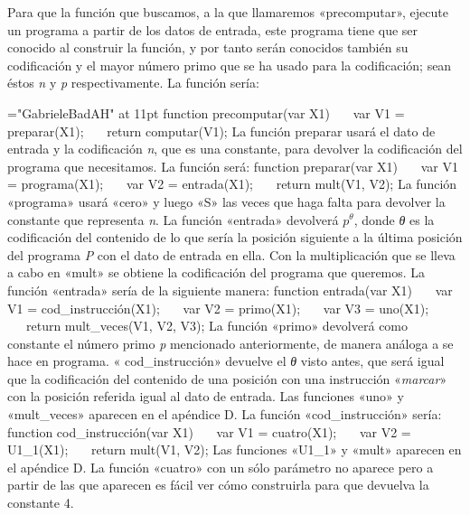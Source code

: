 Para que la función que buscamos, a la que llamaremos «{\fgabrielen precomputar}», ejecute un
programa a partir de los datos de entrada, este programa tiene que ser conocido al construir la
función, y por tanto serán conocidos también su codificación y el mayor número primo que se ha
usado para la codificación; sean éstos {\it n} y {\it p} respectivamente. La función sería:

\font\fgabrielen="GabrieleBadAH" at 11pt
\cachosrec
function precomputar(var X1)
~~~var V1 = preparar(X1);
~~~return computar(V1);
\fincachos
La función preparar usará el dato de entrada y la codificación {\it n}, que es una constante, para
devolver la codificación del programa que necesitamos. La función será:
\cachosrec
function preparar(var X1)
~~~var V1 = programa(X1);
~~~var V2 = entrada(X1);
~~~return mult(V1, V2);
\fincachos
La función «{\fgabrielen programa}» usará «{\fgabrielen cero}» y luego «{\fgabrielen S}» las veces
que haga falta para devolver la constante que representa {\it n}. La función «{\fgabrielen entrada}»
devolverá $ p^\theta $, donde {\it θ\/} es la codificación del contenido de lo que sería la posición
siguiente a la última posición del programa {\it P} con el dato de entrada en ella. Con la
multiplicación que se lleva a cabo en «{\fgabrielen mult}» se obtiene la codificación del programa
que queremos. La función «{\fgabrielen entrada}» sería  de la siguiente manera:
\cachosrec
function entrada(var X1)
~~~var V1 = cod\_instrucción(X1);
~~~var V2 = primo(X1);
~~~var V3 = uno(X1);
~~~return mult\_veces(V1, V2, V3);
\fincachos
La función «{\fgabrielen primo}» devolverá como constante el número primo {\it p} mencionado
anteriormente, de manera análoga a se hace en {\fgabrielen programa}. «{\fgabrielen
cod\_instrucción}» devuelve el {\it θ\/} visto antes, que será igual que la codificación del
contenido de una posición con una instrucción «{\it marcar}» con la posición referida igual al dato
de entrada. Las funciones «{\fgabrielen uno}» y «{\fgabrielen mult\_veces}» aparecen en el apéndice
D.  La función «{\fgabrielen cod\_instrucción}» sería:
\cachosrec
function cod\_instrucción(var X1)
~~~var V1 = cuatro(X1);
~~~var V2 = U1\_1(X1);
~~~return mult(V1, V2);
\fincachos
Las funciones «{\fgabrielen U1\_1}» y «{\fgabrielen mult}» aparecen en el apéndice D. La función
«{\fgabrielen cuatro}» con un sólo parámetro no aparece pero a partir de las que aparecen es fácil
ver cómo construirla para que devuelva la constante 4.


